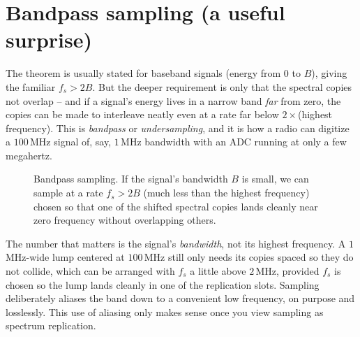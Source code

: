 \section{Bandpass sampling (a useful surprise)}
\label{ch18:bandpass}

The theorem is usually stated for baseband signals (energy from $0$ to $B$), giving the
familiar $f_s > 2B$. But the deeper requirement is only that the spectral copies not
overlap -- and if a signal's energy lives in a narrow band \emph{far} from zero, the
copies can be made to interleave neatly even at a rate far below $2 \times$(highest
frequency). This is \emph{bandpass} or \emph{undersampling}, and it is how a radio can
digitize a $100$\,MHz signal of, say, $1$\,MHz bandwidth with an ADC running at only a
few megahertz.

\begin{figure}[H]
\centering
{}
\caption{Bandpass sampling. If the signal's bandwidth $B$ is small, we can sample at a rate $f_s > 2B$ (much less than the highest frequency) chosen so that one of the shifted spectral copies lands cleanly near zero frequency without overlapping others.}
\label{ch18:fig-bandpass}
\end{figure}

\begin{intuitionbox}
The number that matters is the signal's \emph{bandwidth}, not its highest frequency. A
$1$\,MHz-wide lump centered at $100$\,MHz still only needs its copies spaced so they do
not collide, which can be arranged with $f_s$ a little above $2\,\text{MHz}$, provided
$f_s$ is chosen so the lump lands cleanly in one of the replication slots. Sampling
deliberately aliases the band down to a convenient low frequency, on purpose and
losslessly. This use of aliasing only makes sense once you
view sampling as spectrum replication.
\end{intuitionbox}


